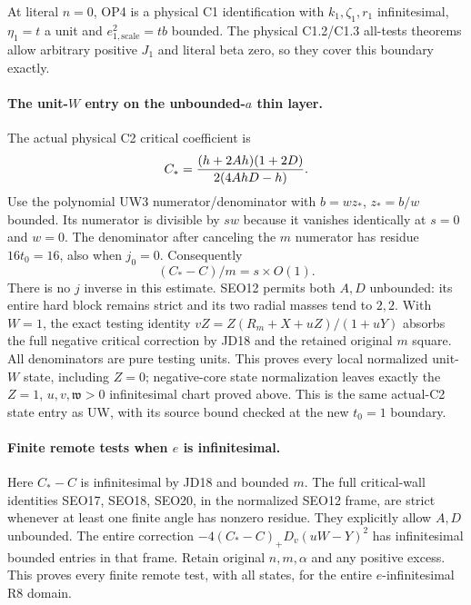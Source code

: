At literal $n=0$, OP4 is a physical C1 identification with
$k_1,\zeta_1,r_1$ infinitesimal, $\eta_1=t$ a unit and
$e_{1,\mathrm{scale}}^2=tb$ bounded.  The physical C1.2/C1.3
all-tests theorems allow arbitrary positive $J_1$ and literal beta
zero, so they cover this boundary exactly.

\paragraph{The unit-$W$ entry on the unbounded-$a$ thin layer.}
The actual physical C2 critical coefficient is
\[
 C_*={(h+2Ah)(1+2D)\over2(4AhD-h)}.
\]
Use the polynomial UW3 numerator/denominator with $b=wz_*$,
$z_*=b/w$ bounded.  Its numerator is divisible by $sw$ because it
vanishes identically at $s=0$ and $w=0$.  The denominator after
canceling the $m$ numerator has residue $16t_0=16$, also when
$j_0=0$.  Consequently
\[
                   (C_*-C)/m=s\times O(1).            \tag{JD18}
\]
There is no $j$ inverse in this estimate.  SEO12 permits both $A,D$
unbounded: its entire hard block remains strict and its two radial
masses tend to $2,2$.  With $W=1$, the exact testing identity
$vZ=Z(R_m+X+uZ)/(1+uY)$ absorbs the full negative critical correction
by JD18 and the retained original $m$ square.  All denominators are
pure testing units.  This proves every local normalized unit-$W$
state, including $Z=0$; negative-core state normalization leaves
exactly the $Z=1$, $u,v,\mathfrak w>0$ infinitesimal chart proved
above.  This is the same actual-C2 state entry as UW, with its
source bound checked at the new $t_0=1$ boundary.

\paragraph{Finite remote tests when $e$ is infinitesimal.}
Here $C_*-C$ is infinitesimal by JD18 and bounded $m$.
The full critical-wall identities SEO17, SEO18, SEO20, in the
normalized SEO12 frame, are strict whenever at least one finite
angle has nonzero residue.  They explicitly allow $A,D$ unbounded.
The entire correction $-4(C_*-C)_+D_v(uW-Y)^2$ has infinitesimal
bounded entries in that frame.  Retain original $n,m,\alpha$ and
any positive excess.  This proves every finite remote test, with
all states, for the entire $e$-infinitesimal R8 domain.

